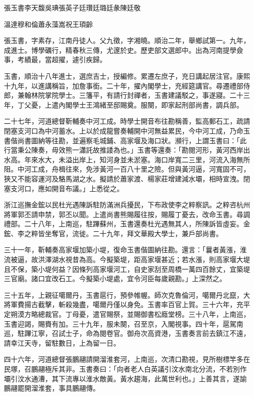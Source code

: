 
\begin{pinyinscope}
張玉書李天馥吳琠張英子廷瓚廷璐廷彖陳廷敬

溫達穆和倫蕭永藻嵩祝王頊齡

張玉書，字素存，江南丹徒人。父九徵，字湘曉。順治二年，舉鄉試第一。九年，成進士。博學礪行，精春秋三傳，尤邃於史。歷吏部文選郎中。出為河南提學僉事，考績最，當超擢，遽引疾歸。

玉書，順治十八年進士，選庶吉士，授編修。累遷左庶子，充日講起居注官。康熙十九年，以進講稱旨，加詹事銜。二十年，擢內閣學士，充經筵講官。尋遷禮部侍郎，兼翰林院掌院學士。三籓平，有請行封禪者，玉書建議駁之，事遂寢。二十三年，丁父憂，上遣內閣學士王鴻緒至邸賜奠。服闋，即家起刑部尚書，調兵部。

二十七年，河道總督靳輔奏中河工成。時學士開音布往勘稱善，監高郵石工，疏請閉塞支河口為中河蓄水。上以於成龍嘗奏輔開中河無益累民，今中河工成，乃命玉書偕尚書圖納等往勘，並遍察毛城鋪、高家堰及海口狀。瀕行，上謂玉書曰：「此行當秉公陳奏，毋效熊一瀟託故推諉為也。」玉書等還奏：「勘閱河形，黃河西岸出水高。年來水大，未溢出岸上，知河身並未淤塞。海口岸寬二三里，河流入海無所阻。中河工成，舟楫往來，免涉黃河一百八十里之險。但與黃河逼，河寬固不可，狹又不能容運河及駱馬湖之水。擬請於蕭家渡、楊家莊增建減水壩，相時宣洩。閉塞支河口，應如開音布議。」上悉從之。

浙江巡撫金鋐以民杜光遇陳訴駐防滿洲兵擾民，下布政使李之粹察訊。之粹咨杭州將軍郭丕請申禁，郭丕以聞。上遣尚書熊賜履往按，賜履丁憂去，改命玉書。尋調禮部。二十八年，上南巡，駐蹕蘇州，玉書還奏杜光遇無其人，所陳訴皆虛妄。金鋐、李之粹皆坐奪官，流徙。二十九年，拜文華殿大學士，兼戶部尚書。

三十一年，靳輔奏高家堰加築小堤，復命玉書偕圖納往勘。還言：「曩者黃漲，淮流被逼，故洪澤湖水視昔為高。今擬築堤，距高家堰甚近；若水漲，則高家堰大堤且不保，築小堤何益？因條列高家堰河工，自史家刮至周橋一萬四百餘丈，宜築堤三官廟。諸口宜改石工。今擬築小堤處，宜令河臣每歲親勘。」上深然之。

三十五年，上親征噶爾丹，玉書扈行，預參帷幄。師次克魯倫河，噶爾丹北竄，大將軍費揚古截擊，斬殺幾盡，噶爾丹僅以身免。玉書率百官上賀。三十六年，充平定朔漠方略總裁官。丁母憂，遣官賜祭，並賜御書松廕堂榜。三十八年，上南巡，玉書迎謁，賜賚有加。三十九年，服未闋，召至京，入閣視事。四十年，扈駕南巡，駐蹕江寧，召試士子，命為閱卷官。御舟次高資港，玉書奏言前去鎮江不遠，請幸江天寺，留駐數日，上為留一日。

四十六年，河道總督張鵬翮請開溜淮套河，上南巡，次清口勘視，見所樹標竿多在民塚，召鵬翮極斥其非。玉書奏曰：「向者老人白英議引汶水南北分流，不若別作壩引汶水通漕，其下流專以淮水敵黃。黃水趨海，此萬世利也。」上善其言，遂諭鵬翮罷開溜淮套，事具鵬翮傳。


\end{pinyinscope}
